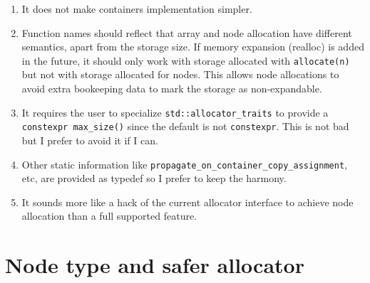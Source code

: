 \documentclass[11pt]{article}
\begin{document}
\begin{enumerate}
\item It does not make containers implementation simpler.

\item Function names should reflect that array and node allocation have
different semantics, apart from the storage size. If memory expansion (realloc)
is added in the future, it should only work with storage allocated with
\texttt{allocate(n)} but not with storage allocated for nodes. This allows node
allocations to avoid extra bookeeping data to mark the storage as
non-expandable.

\item It requires the user to specialize \texttt{std::allocator\_traits} to
provide a \texttt{constexpr max\_size()} since the default is not
\texttt{constexpr}. This is not bad but I prefer to avoid it if I can.

\item Other static information like \texttt{propagate\_on\_container\_copy\_assignment}, etc,
are provided as typedef so I prefer to keep the harmony.

\item It sounds more like a hack of the current allocator interface to achieve
node allocation than a full supported feature.

\end{enumerate}

\newpage

\section{Node type and safer allocator} \label{saferalloc}
\end{document}
